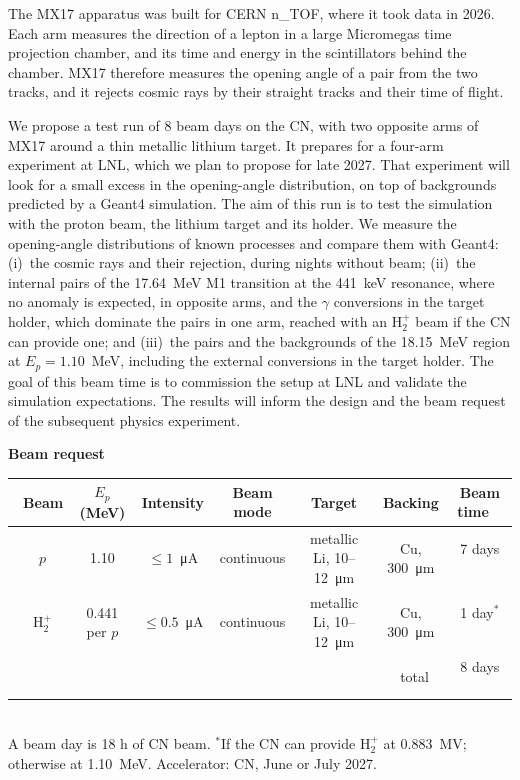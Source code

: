 The MX17 apparatus was built for CERN n\_TOF, where it took data in 2026. Each arm measures the direction of a lepton
in a large Micromegas time projection chamber, and its time and energy in the scintillators behind the chamber. MX17
therefore measures the opening angle of a pair from the two tracks, and it rejects cosmic rays by their straight tracks
and their time of flight.

We propose a test run of 8 beam days on the CN, with two opposite arms of MX17 around a thin metallic lithium
target. It prepares for a four-arm \Xs{} experiment at LNL, which we plan to propose for late 2027. That experiment will
look for a small excess in the opening-angle distribution, on top of backgrounds predicted by a Geant4 simulation. The aim
of this run is to test the simulation with the proton beam, the lithium target and its holder. We
measure the opening-angle distributions of known processes and compare them with Geant4: (i)~the cosmic rays and their
rejection, during nights without beam; (ii)~the internal pairs of the 17.64~MeV M1 transition at the 441~keV resonance,
where no anomaly is expected, in opposite arms, and the $\gamma$ conversions in the target holder, which dominate the pairs in one arm,
reached with an H$_2^+$ beam if the CN can provide one; and (iii)~the pairs and the backgrounds of the 18.15~MeV region at
$E_p = 1.10$~MeV, including the external conversions in the target holder. The goal of this beam time is to commission the setup at LNL and validate the simulation expectations. The results will inform the design and the beam request of the subsequent physics experiment.

\vspace{.3cm}
\begin{center}
{\bf Beam request}\\[.2cm]
\begin{tabular}{|c|c|c|c|c|c|c|}
\hline
\ Beam & $E_p$ (MeV) & Intensity & Beam mode & Target & Backing & Beam time \ \\
\hline
\ $p$ & 1.10 & $\le 1$~\si{\micro\ampere} & continuous & metallic Li, 10--12~\si{\micro\metre} & Cu, 300~\si{\micro\metre} & 7 days \ \\
\ H$_2^+$ & 0.441 per $p$ & $\le 0.5$~\si{\micro\ampere} & continuous & metallic Li, 10--12~\si{\micro\metre} & Cu, 300~\si{\micro\metre} & 1 day$^*$ \ \\
\hline
\multicolumn{6}{|r|}{total \ } & 8 days \ \\
\hline
\end{tabular}\\[.15cm]
A beam day is 18 h of CN beam. $^*$If the CN can provide H$_2^+$ at 0.883~MV; otherwise at 1.10~MeV. Accelerator: CN, June or July 2027.
\end{center}
